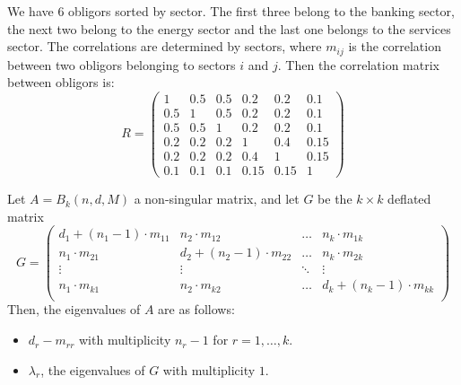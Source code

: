 \documentclass[11pt,fleqn]{book} %
\begin{document}
\begin{example}
	\label{example1}
	We have $6$ obligors sorted by sector. The first three belong to the 
	banking sector, the next two belong to the energy sector 
	and the last one belongs to the services sector. The correlations are 
	determined by sectors, where $m_{ij}$ is the correlation between two 
	obligors belonging to sectors $i$ and $j$. Then the correlation matrix 
	between obligors is:
	\begin{displaymath}
		R=
		\left(
		\begin{array}{ccc|cc|c} 
			1   & 0.5 & 0.5 & 0.2  & 0.2  & 0.1  \\ 
			0.5 & 1   & 0.5 & 0.2  & 0.2  & 0.1  \\ 
			0.5 & 0.5 & 1   & 0.2  & 0.2  & 0.1  \\ 
			\hline
			0.2 & 0.2 & 0.2 & 1    & 0.4  & 0.15 \\ 
			0.2 & 0.2 & 0.2 & 0.4  & 1    & 0.15 \\ 
			\hline
			0.1 & 0.1 & 0.1 & 0.15 & 0.15 & 1    
		\end{array} 
		\right)
	\end{displaymath}
\end{example}

\begin{proposition}
	\label{prop1}
	Let $A = B_k(n, d, M)$ a non-singular matrix, and let $G$ be the $k {\times} k$ 
	deflated matrix
	\begin{displaymath}
		G =
		\left( \begin{array}{cccc}
		d_1+(n_1-1)\cdot m_{11} & n_2 \cdot m_{12}        & \dots  & n_k \cdot m_{1k} \\
		n_1\cdot m_{21}         & d_2+(n_2-1)\cdot m_{22} & \dots  & n_k \cdot m_{2k} \\
		\vdots                  & \vdots                  & \ddots & \vdots \\
		n_1\cdot m_{k1}         & n_2 \cdot m_{k2}        & \dots  & d_k+(n_k-1)\cdot m_{kk} \\
		\end{array} \right)
	\end{displaymath}
	Then, the eigenvalues of $A$ are as follows:
	\begin{itemize}
		\item $d_{r}-m_{rr}$ with multiplicity $n_r-1$ for $r=1,\dots,k$.
		\item $\lambda_r$, the eigenvalues of $G$ with multiplicity $1$.
	\end{itemize}
\end{proposition}
\end{document}
